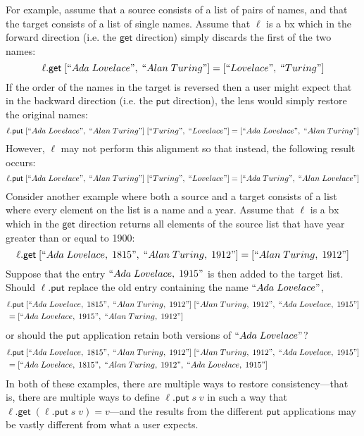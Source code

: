 \documentclass[acmsmall,review,anonymous]{acmart}\settopmatter{printfolios=true,printccs=false,printacmref=false}
\theoremstyle{definition}
\newcommand{\kw}[1]{\ensuremath{\mathsf{#1}}\xspace}
\newcommand{\get}{\ensuremath{\kw{get}}\xspace}
\newcommand{\pput}{\ensuremath{\kw{put}}\xspace}
\begin{document}
For example, assume that a source consists of a list of pairs of names, and that the target consists of a list of single names. Assume that $\ell$ is a bx which in the forward direction (i.e. the \get direction) simply discards the first of the two names:
$$\ell.\get \; [``Ada \; Lovelace", \; ``Alan \; Turing"] = [``Lovelace", \; ``Turing"]$$
If the order of the names in the target is reversed then a user might expect that in the backward direction (i.e. the \pput direction), the lens would simply restore the original names:
$$\ell.\pput \; [``Ada \; Lovelace", \; ``Alan \; Turing"] \; [``Turing", \; ``Lovelace"] = [``Ada \; Lovelace", \; ``Alan \; Turing"]$$
However, $\ell$ may not perform this alignment so that instead, the following result occurs:
$$\ell.\pput \; [``Ada \; Lovelace", \; ``Alan \; Turing"] \; [``Turing", \; ``Lovelace"] = [``Ada \; Turing", \; ``Alan \; Lovelace"]$$
Consider another example where both a source and a target consists of a list where every element on the list is a name and a year. Assume that $\ell$ is a bx which in the \get direction returns all elements of the source list that have year greater than or equal to 1900:
$$\ell.\get \; [``Ada \; Lovelace, \; 1815", \; ``Alan \; Turing, \; 1912"] = [``Alan \; Turing, \; 1912"]$$
Suppose that the entry $``Ada \; Lovelace, \; 1915"$ is then added to the target list. Should $\ell.\pput$ replace the old entry containing the name $``Ada \; Lovelace"$,
\begin{align*}
&\ell.\pput \; [``Ada \; Lovelace, \; 1815", \; ``Alan \; Turing, \; 1912"] \; [``Alan \; Turing, \; 1912", \; ``Ada \; Lovelace, \; 1915"] \\
&= [``Ada \; Lovelace, \; 1915", \; ``Alan \; Turing, \; 1912"]
\end{align*}
or should the \pput application retain both versions of $``Ada \; Lovelace"$?
\begin{align*}
&\ell.\pput \; [``Ada \; Lovelace, \; 1815", \; ``Alan \; Turing, \; 1912"] \; [``Alan \; Turing, \; 1912", \; ``Ada \; Lovelace, \; 1915"] \\
&= [``Ada \; Lovelace, \; 1815", \; ``Alan \; Turing, \; 1912", \; ``Ada \; Lovelace, \; 1915"]
\end{align*}
In both of these examples, there are multiple ways to restore consistency---that is, there are multiple ways to define $\ell.\pput \; s \; v$ in such a way that $\ell.\get \; (\ell.\pput \; s \; v) = v$---and the results from the different \pput applications may be vastly different from what a user expects. 
\end{document}
